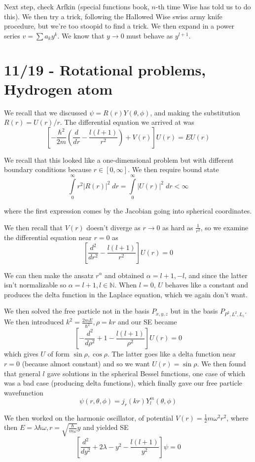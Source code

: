 \documentclass[10pt]{report}
\newcommand{\rd}[2]{\frac{d#1}{d#2}}
\newcommand{\abs}[1]{\left|#1\right|}
\newcommand{\rtd}[2]{\frac{d^2#1}{d#2^2}}
\begin{document}
Next step, check Arfkin (special functions book, $n$-th time Wise has told us to do this). We then try a trick, following the Hallowed Wise swiss army knife procedure, but we're too stoopid to find a trick. We then expand in a power series $v = \sum a_k y^k$. We know that $y \to 0$ must behave as $y^{l+1}$. 

\chapter{11/19 - Rotational problems, Hydrogen atom}

We recall that we discussed $\psi = R(r)Y(\theta,\phi)$, and making the substitution $R(r) = U(r)/r$. The differential equation we arrived at was
$$\left[-\frac{\hbar^2}{2m} \left( \rd{}{r} - \frac{l(l+1)}{r^2} \right) + V(r)\right] U(r) = EU(r)$$

We recall that this looked like a one-dimensional problem but with different boundary conditions because $r \in [0,\infty]$. We then require bound state
$$\displaystyle\int\limits_{0}^{\infty}r^2\abs{R(r)}^2\;dr = \displaystyle\int\limits_{0}^{\infty}\abs{U(r)}^2\;dr < \infty$$

where the first expression comes by the Jacobian going into spherical coordinates.

We then recall that $V(r)$ doesn't diverge as $r \to 0$ as hard as $\frac{1}{r^2}$, so we examine the differential equation near $r=0$ as
$$\left[ \rtd{}{r} - \frac{l(l+1)}{r^2}\right]U(r) = 0$$

We can then make the ansatz $r^\alpha$ and obtained $\alpha = l+1, -l$, and since the latter isn't normalizable so $\alpha = l+1, l \in \mathbb{N}$. When $l=0$, $U$ behaves like a constant and produces the delta function in the Laplace equation, which we again don't want.

We then solved the free particle not in the basis $P_{x,y,z}$ but in the basis $P_{P^2, L^2, L_z}$. We then introduced $k^2 = \frac{2mE}{\hbar^2}, \rho = kr$ and our SE became
$$\left[ -\rtd{}{\rho} + 1 - \frac{l(l+1)}{\rho^2} \right]U(r) = 0$$
which gives $U$ of form $ \sin \rho, \cos \rho$. The latter goes like a delta function near $r=0$ (because almost constant) and so we want $U(r) = \sin \rho$. We then found that general $l$ gave solutions in the spherical Bessel functions, one case of which was a bad case (producing delta functions), which finally gave our free particle wavefunction
$$\psi(r,\theta,\phi) = j_r(kr)Y_l^m(\theta,\phi)$$

We then worked on the harmonic oscillator, of potential $V(r) = \frac{1}{2}m\omega^2r^2$, where then $E = \lambda \hbar \omega, r = \sqrt{\frac{\hbar}{m\omega}}y$ and yielded SE
$$\left[ \rtd{}{y} + 2\lambda - y^2 - \frac{l(l+1)}{y^2} \right]\psi = 0$$
\end{document}
